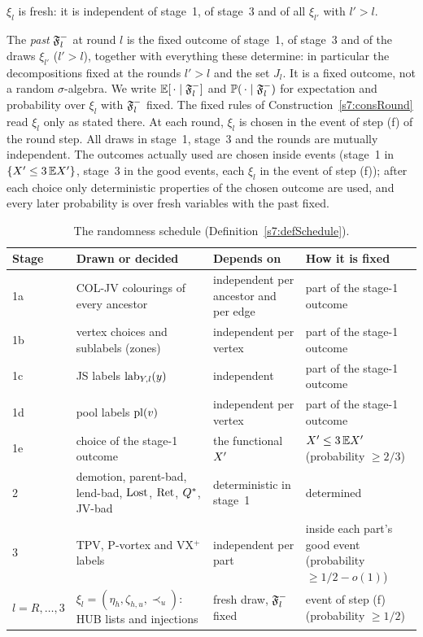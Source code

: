 \begin{definition}
\begin{itemize}
$\xi_l$ is fresh: it is independent of stage~1, of stage~3 and of all $\xi_{l'}$
with $l'>l$.
\end{itemize}
The \emph{past} $\mathfrak{F}^{-}_l$ at round $l$ is the fixed outcome of stage~1, of
stage~3 and of the draws $\xi_{l'}$ ($l'>l$), together with everything these
determine: in particular the decompositions fixed at the rounds $l'>l$ and the
set $J_l$. It is a fixed outcome, not a random $\sigma$-algebra. We write
$\mathbb{E}[\,\cdot\mid\mathfrak{F}^{-}_l]$ and $\mathbb{P}(\,\cdot\mid\mathfrak{F}^{-}_l)$ for expectation and
probability over $\xi_l$ with $\mathfrak{F}^{-}_l$ fixed. The fixed rules of
Construction~\ref{s7:consRound} read $\xi_l$ only as stated there. At each round, $\xi_l$ is chosen in
the event of step (f) of the round step. All draws in stage~1, stage~3 and the
rounds are mutually independent. The outcomes actually used are chosen inside
events (stage~1 in $\{X'\le3\,\mathbb{E}X'\}$, stage~3 in the good events, each
$\xi_l$ in the event of step (f)); after each choice only deterministic
properties of the chosen outcome are used, and every later probability is over
fresh variables with the past fixed.
\deps{\ref{s3:defCOL}, \ref{s5:defZones}, \ref{s7:defPool}, \ref{s6:defLending}, \ref{s5:defStages}, \ref{s7:defCand}, \ref{s4:lemTPV}, \ref{s4:lemPV}, \ref{s4:thmVXp}, \ref{s5:lemChild}, \ref{s5:lemDemoted}}
\end{definition}

\begin{table}[ht]
\centering
\small
\begin{tabular}{|p{1.5cm}|p{5.9cm}|p{3.6cm}|p{3.8cm}|}
\hline
\textbf{Stage} & \textbf{Drawn or decided} & \textbf{Depends on} & \textbf{How it is fixed}\\
\hline
1a & COL-JV colourings of every ancestor & independent per ancestor and per edge & part of the stage-1 outcome\\
1b & vertex choices and sublabels (zones) & independent per vertex & part of the stage-1 outcome\\
1c & JS labels $\mathrm{lab}_{Y,l}(y)$ & independent & part of the stage-1 outcome\\
1d & pool labels $\mathrm{pl}(v)$ & independent per vertex & part of the stage-1 outcome\\
1e & choice of the stage-1 outcome & the functional $X'$ & $X'\le3\,\mathbb{E}X'$ (probability $\ge2/3$)\\
\hline
2 & demotion, parent-bad, lend-bad, $\mathrm{Lost}$, $\mathrm{Ret}$, $Q^{*}$, JV-bad & deterministic in stage~1 & determined\\
\hline
3 & TPV, P-vortex and VX$^+$ labels & independent per part & inside each part's good event (probability $\ge1/2-o(1)$)\\
\hline
$l=R,\dots,3$ & $\xi_l=(\eta_h,\zeta_{h,u},\prec_u)$: HUB lists and injections & fresh draw, $\mathfrak{F}^{-}_l$ fixed & event of step (f) (probability $\ge1/2$)\\
\hline
\end{tabular}
\caption{The randomness schedule (Definition~\ref{s7:defSchedule}).}
\label{s7:tabSchedule}
\end{table}


